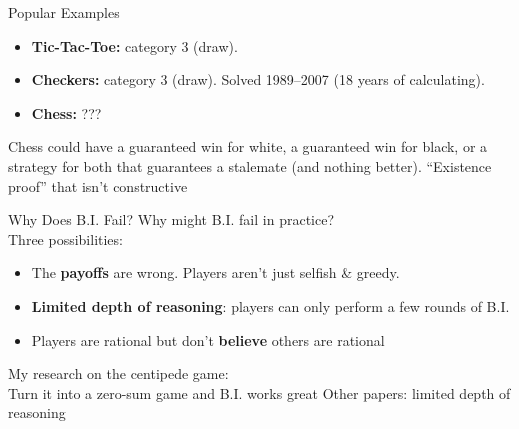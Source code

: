 \begin{frame}{Popular Examples}
\begin{itemize}
    \item \textbf{Tic-Tac-Toe:} category 3 (draw).
    \vspace{0.25in}
    \item \textbf{Checkers:} category 3 (draw). Solved 1989--2007 (18 years of calculating). \vspace{0.25in}
    \item \textbf{Chess:} ??? \vspace{0.25in}
\end{itemize}
\vfill
Chess could have a guaranteed win for white, a guaranteed win for black, or a strategy for both that guarantees a stalemate (and nothing better).
\bsk
``Existence proof'' that isn't constructive 
\vspace{-0.3in}
\end{frame}


\begin{frame}{Why Does B.I. Fail?}
Why might B.I. fail in practice?\\
Three possibilities:
\bsk
\begin{itemize}
    \item The \textbf{payoffs} are wrong. Players aren't just selfish \& greedy. \vspace{0.25in}
    \item \textbf{Limited depth of reasoning}: players can only perform a few rounds of B.I. \vspace{0.25in}
    \item Players are rational but don't \textbf{believe} others are rational \vspace{0.25in}
\end{itemize}
\vfill
My research on the centipede game:\\
Turn it into a zero-sum game and B.I. works great
\bsk
Other papers: limited depth of reasoning
\vspace{-0.3in}
\end{frame}



